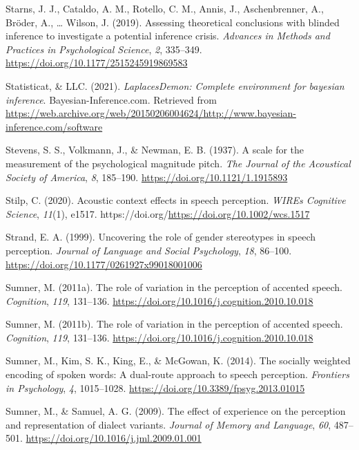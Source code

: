 \documentclass[
  11pt,
  english,
  man,floatsintext]{apa6}
\newlength{\cslhangindent}
\newlength{\cslentryspacingunit} %
\newenvironment{CSLReferences}[2] %
 {%
  \setlength{\parindent}{0pt}
  \ifodd #1
  \let\oldpar\par
  \def\par{\hangindent=\cslhangindent\oldpar}
  \fi
  \setlength{\parskip}{#2\cslentryspacingunit}
 }%
 {}
\begin{document}
\begin{CSLReferences}{1}{0}
\leavevmode{}%
Starns, J. J., Cataldo, A. M., Rotello, C. M., Annis, J., Aschenbrenner, A., Bröder, A., \ldots{} Wilson, J. (2019). Assessing theoretical conclusions with blinded inference to investigate a potential inference crisis. \emph{Advances in Methods and Practices in Psychological Science}, \emph{2}, 335--349. \url{https://doi.org/10.1177/2515245919869583}

\leavevmode{}%
Statisticat, \& LLC. (2021). \emph{LaplacesDemon: Complete environment for bayesian inference}. Bayesian-Inference.com. Retrieved from \url{https://web.archive.org/web/20150206004624/http://www.bayesian-inference.com/software}

\leavevmode{}%
Stevens, S. S., Volkmann, J., \& Newman, E. B. (1937). A scale for the measurement of the psychological magnitude pitch. \emph{The Journal of the Acoustical Society of America}, \emph{8}, 185--190. \url{https://doi.org/10.1121/1.1915893}

\leavevmode{}%
Stilp, C. (2020). Acoustic context effects in speech perception. \emph{WIREs Cognitive Science}, \emph{11}(1), e1517. https://doi.org/\url{https://doi.org/10.1002/wcs.1517}

\leavevmode{}%
Strand, E. A. (1999). Uncovering the role of gender stereotypes in speech perception. \emph{Journal of Language and Social Psychology}, \emph{18}, 86--100. \url{https://doi.org/10.1177/0261927x99018001006}

\leavevmode{}%
Sumner, M. (2011a). The role of variation in the perception of accented speech. \emph{Cognition}, \emph{119}, 131--136. \url{https://doi.org/10.1016/j.cognition.2010.10.018}

\leavevmode{}%
Sumner, M. (2011b). The role of variation in the perception of accented speech. \emph{Cognition}, \emph{119}, 131--136. \url{https://doi.org/10.1016/j.cognition.2010.10.018}

\leavevmode{}%
Sumner, M., Kim, S. K., King, E., \& McGowan, K. (2014). The socially weighted encoding of spoken words: A dual-route approach to speech perception. \emph{Frontiers in Psychology}, \emph{4}, 1015--1028. \url{https://doi.org/10.3389/fpsyg.2013.01015}

\leavevmode{}%
Sumner, M., \& Samuel, A. G. (2009). The effect of experience on the perception and representation of dialect variants. \emph{Journal of Memory and Language}, \emph{60}, 487--501. \url{https://doi.org/10.1016/j.jml.2009.01.001}


\end{CSLReferences}
\end{document}

